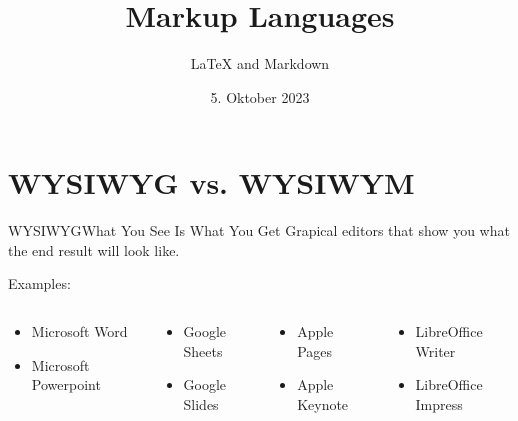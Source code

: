 \documentclass{setbeamer}
\title{Markup Languages}
\subtitle{\LaTeX{} and Markdown}
\institute{\theChairName\\\theDepartmentName\\\theUniversityName}
\date[05.10.2023]{5. Oktober 2023}
\begin{document}
\maketitle



\section{WYSIWYG vs. WYSIWYM}
\begin{frame}{WYSIWYG}{What You See Is What You Get}
    Grapical editors that show you what the end result will look like.

    \vspace{3mm}

    Examples:
    \begin{columns}
        \begin{column}{0.25\textwidth}
            \begin{itemize}
                \item Microsoft Word
                \item Microsoft Powerpoint
            \end{itemize}
        \end{column}

        \begin{column}{0.20\textwidth}
            \begin{itemize}
                \item Google Sheets
                \item Google Slides
            \end{itemize}
        \end{column}

        \begin{column}{0.20\textwidth}
            \begin{itemize}
                \item Apple Pages
                \item Apple Keynote
            \end{itemize}
        \end{column}

        \begin{column}{0.20\textwidth}
            \begin{itemize}
                \item LibreOffice Writer
                \item LibreOffice Impress
            \end{itemize}
        \end{column}
    \end{columns}


\end{frame}
\end{document}
